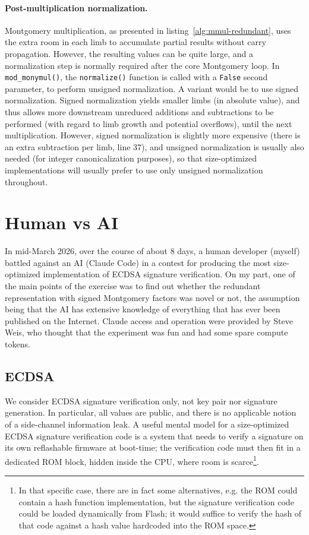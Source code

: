 \documentclass{llncs}
\begin{document}
\paragraph{Post-multiplication normalization.}
Montgomery multiplication, as presented in
listing~\ref{alg:mmul-redundant}, uses the extra room in each limb to
accumulate partial results without carry propagation. However, the
resulting values can be quite large, and a normalization step is
normally required after the core Montgomery loop. In
\verb+mod_monymul()+, the \verb+normalize()+ function is called with a
\verb+False+ second parameter, to perform unsigned normalization. A
variant would be to use signed normalization. Signed normalization
yields smaller limbs (in absolute value), and thus allows more
downstream unreduced additions and subtractions to be performed (with
regard to limb growth and potential overflows), until the next
multiplication. However, signed normalization is slightly more expensive
(there is an extra subtraction per limb, line 37), and unsigned
normalization is usually also needed (for integer canonicalization
purposes), so that size-optimized implementations will usually prefer to
use only unsigned normalization throughout.


\newpage
\section{Human vs AI}\label{sec:showdown}

In mid-March 2026, over the course of about 8 days, a human developer
(myself) battled against an AI (Claude Code) in a contest for producing
the most size-optimized implementation of ECDSA signature verification.
On my part, one of the main points of the exercise was to find out
whether the redundant representation with signed Montgomery factors was
novel or not, the assumption being that the AI has extensive knowledge
of everything that has ever been published on the Internet. Claude
access and operation were provided by Steve Weis, who thought that the
experiment was fun and had some spare compute tokens.

\subsection{ECDSA}

We consider ECDSA signature verification only, not key pair nor
signature generation. In particular, all values are public, and there is
no applicable notion of a side-channel information leak. A useful mental
model for a size-optimized ECDSA signature verification code is a system
that needs to verify a signature on its own reflashable firmware at
boot-time; the verification code must then fit in a dedicated ROM block,
hidden inside the CPU, where room is scarce\footnote{In that specific
case, there are in fact some alternatives, e.g. the ROM could contain a
hash function implementation, but the signature verification code could
be loaded dynamically from Flash; it would suffice to verify the hash of
that code against a hash value hardcoded into the ROM space.}.
\end{document}
